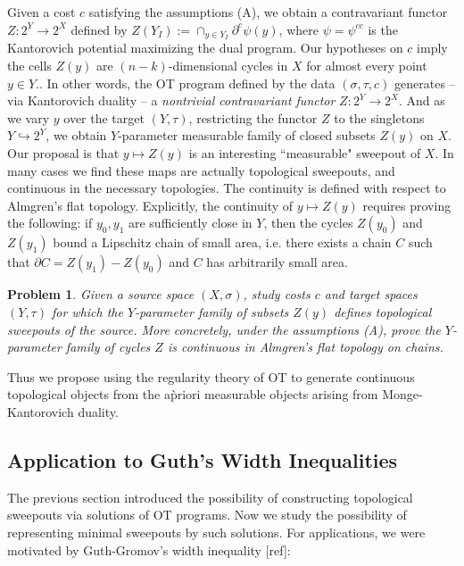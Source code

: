 \documentclass[12pt]{amsart}
\newtheorem{prob}{Problem}
\theoremstyle{definition}
\theoremstyle{remark}
\newcommand{\del}{\partial}
\newcommand{\sub}{\del^c \psi(y)}
\begin{document}
Given a cost $c$ satisfying the assumptions (A), we obtain a contravariant functor $Z: 2^Y \to 2^X$ defined by $Z(Y_I):=\cap_{y\in Y_I} \sub$, where $\psi=\psi^{cc}$ is the Kantorovich potential maximizing the dual program. Our hypotheses on $c$ imply the cells $Z(y)$ are $(n-k)$-dimensional cycles in $X$ for almost every point $y\in Y$.. In other words, the OT program defined by the data $(\sigma, \tau, c)$ generates -- via Kantorovich duality -- a \emph{nontrivial contravariant functor} $Z: 2^Y \to 2^X$. And as we vary $y$ over the target $(Y, \tau)$, restricting the functor $Z$ to the singletons $Y \hookrightarrow 2^Y$, we obtain $Y$-parameter measurable family of closed subsets $Z(y)$ on $X$. Our proposal is that $y\mapsto Z(y)$ is an interesting ``measurable" sweepout of $X$. In many cases we find these maps are actually topological sweepouts, and continuous in the necessary topologies. The continuity is defined with respect to Almgren's flat topology. Explicitly, the continuity of $y\mapsto Z(y)$ requires proving the following: if $y_0, y_1$ are sufficiently close in $Y$, then the cycles $Z(y_0)$ and $Z(y_1)$ bound a Lipschitz chain of small area, i.e. there exists a chain $C$ such that $\del C = Z(y_1)-Z(y_0)$ and $C$ has arbitrarily small area.


\begin{prob}
\label{alm}
Given a source space $(X, \sigma)$, study costs $c$ and target spaces $(Y, \tau)$ for which the $Y$-parameter family of subsets $Z(y)$ defines topological sweepouts of the source. More concretely, under the assumptions (A), prove the $Y$-parameter family of cycles $Z$ is continuous in Almgren's flat topology on chains. 
\end{prob}

Thus we propose using the regularity theory of OT to generate continuous topological objects from the a\` priori measurable objects arising from Monge-Kantorovich duality. 

\subsection{Application to Guth's Width Inequalities}

The previous section introduced the possibility of constructing topological sweepouts via solutions of OT programs. Now we study the possibility of representing minimal sweepouts by such solutions. For applications, we were motivated by Guth-Gromov's width inequality [ref]: 
\end{document}
